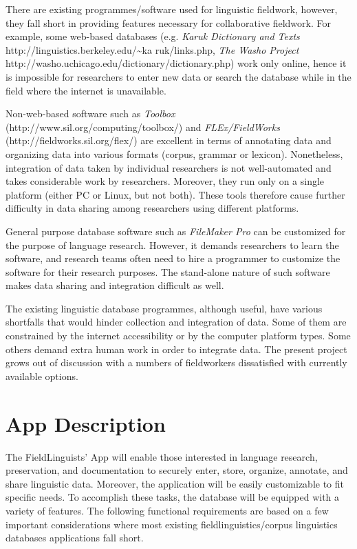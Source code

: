 \documentclass[12 pt]{article}
\begin{document}
There are existing programmes/software used for linguistic fieldwork, 
however, they fall short in providing features necessary for collaborative fieldwork. 
For example, some web-based databases (e.g.  {\it Karuk Dictionary and Texts} http://linguistics.berkeley.edu/{\textasciitilde}ka
ruk/links.php,   {\it The Washo Project} http://washo.uchicago.edu/dictionary/dictionary.php) work only online, hence it is impossible for researchers to enter new data or search the database while in the field where the internet is unavailable.  

Non-web-based software such as {\it Toolbox} (http://www.sil.org/computing/toolbox/) and {\it FLEx/FieldWorks} (http://fieldworks.sil.org/flex/)
are excellent in terms of annotating data and organizing data into various formats (corpus, grammar or lexicon). Nonetheless, integration of data taken by individual researchers is not well-automated and takes considerable work by researchers. Moreover, they run only on a single platform (either PC or Linux, but not both). These tools therefore cause further difficulty in data sharing among researchers using different platforms.  

General purpose database software such as {\it FileMaker Pro} can be customized for the purpose of language research. However, it demands researchers to learn the software, and research teams often need to hire a programmer to customize the software for their research purposes. The stand-alone nature of such software makes data sharing and integration difficult as well. 

The existing linguistic database programmes, although useful, have various shortfalls that would hinder collection and integration of data. Some of them are constrained by the internet accessibility or by the computer platform types. Some others demand extra human work in order to integrate data. 
The present project grows out of discussion with a numbers of fieldworkers dissatisfied with currently available options. 


\section {App Description}

The FieldLinguists' App will enable those interested in language research, preservation, and documentation to securely enter, store, organize, annotate, and share linguistic data. Moreover, the application will be easily customizable to fit specific needs. To accomplish these tasks, the database will be equipped with a variety of features. 
The following functional requirements are based on a few important considerations where most existing fieldlinguistics/corpus linguistics databases applications fall short. 
\end{document}
